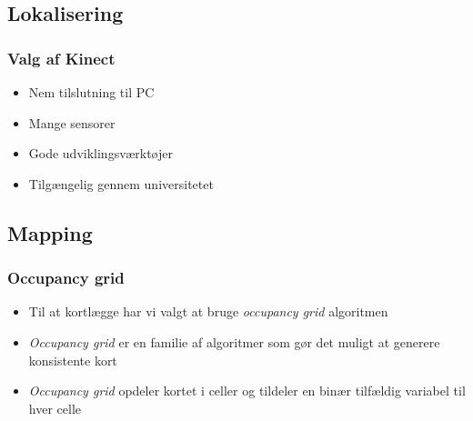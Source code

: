 \subsection{Lokalisering}
\begin{frame}
\frametitle{Valg af Kinect}
\begin{itemize}
\item Nem tilslutning til PC
\item Mange sensorer
\item Gode udviklingsværktøjer
\item Tilgængelig gennem universitetet
\end{itemize}
\end{frame}
\subsection{Mapping}
\begin{frame}
\frametitle{Occupancy grid}
\begin{itemize}
\item Til at kortlægge har vi valgt at bruge \textit{occupancy grid} algoritmen
\item \textit{Occupancy grid} er en familie af algoritmer som gør det muligt at generere konsistente kort
\item \textit{Occupancy grid} opdeler kortet i celler og tildeler en binær tilfældig variabel til hver celle
\end{itemize}
\end{frame}